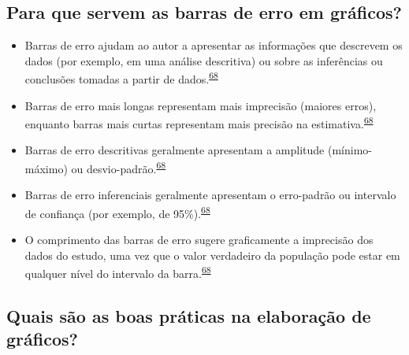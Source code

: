 \documentclass[
]{book}
\begin{document}
\hypertarget{para-que-servem-as-barras-de-erro-em-gruxe1ficos}{%
\subsection{Para que servem as barras de erro em gráficos?}\label{para-que-servem-as-barras-de-erro-em-gruxe1ficos}}

\begin{itemize}
\item
  Barras de erro ajudam ao autor a apresentar as informações que descrevem os dados (por exemplo, em uma análise descritiva) ou sobre as inferências ou conclusões tomadas a partir de dados.\textsuperscript{\protect\hyperlink{ref-Cumming2007}{68}}
\item
  Barras de erro mais longas representam mais imprecisão (maiores erros), enquanto barras mais curtas representam mais precisão na estimativa.\textsuperscript{\protect\hyperlink{ref-Cumming2007}{68}}
\item
  Barras de erro descritivas geralmente apresentam a amplitude (mínimo-máximo) ou desvio-padrão.\textsuperscript{\protect\hyperlink{ref-Cumming2007}{68}}
\item
  Barras de erro inferenciais geralmente apresentam o erro-padrão ou intervalo de confiança (por exemplo, de 95\%).\textsuperscript{\protect\hyperlink{ref-Cumming2007}{68}}
\item
  O comprimento das barras de erro sugere graficamente a imprecisão dos dados do estudo, uma vez que o valor verdadeiro da população pode estar em qualquer nível do intervalo da barra.\textsuperscript{\protect\hyperlink{ref-Cumming2007}{68}}
\end{itemize}

\hypertarget{quais-suxe3o-as-boas-pruxe1ticas-na-elaborauxe7uxe3o-de-gruxe1ficos}{%
\subsection{Quais são as boas práticas na elaboração de gráficos?}\label{quais-suxe3o-as-boas-pruxe1ticas-na-elaborauxe7uxe3o-de-gruxe1ficos}}
\end{document}
